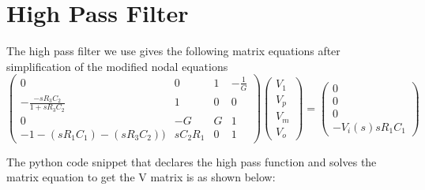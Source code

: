 \documentclass[11pt, a4paper]{article}
\begin{document}
\section*{High Pass Filter}
The high pass filter we use gives the following matrix equations after simplification of the modified nodal equations
\[\begin{pmatrix} 0 & 0 & 1 & -\frac{1}{G} \\ -\frac{-sR_3C_2}{1+sR_3C_2} & 1 & 0 & 0 \\ 0 & -G & G & 1 \\ -1-(sR_1C_1)-(sR_3C_2)) & sC_2R_1 & 0 & 1 \end{pmatrix}\begin{pmatrix} V_1 \\ V_p \\ V_m \\ V_o \end{pmatrix} = \begin{pmatrix} 0 \\ 0 \\ 0 \\ -V_i(s)sR_1C_1 \end{pmatrix}\]

The python code snippet that declares the high pass function and solves the matrix equation to get the V matrix is as shown below:
\end{document}
